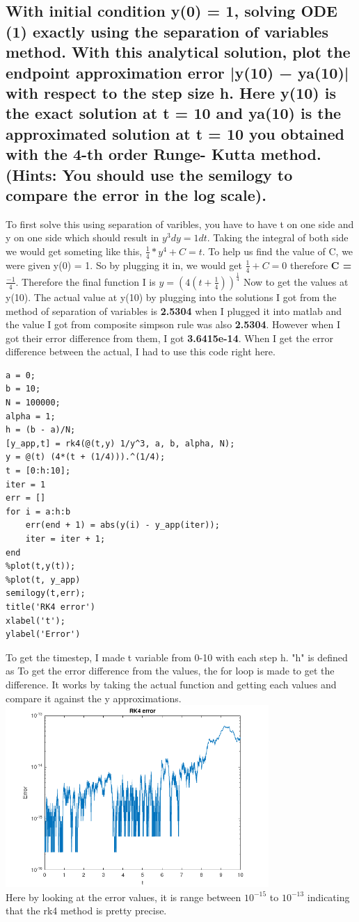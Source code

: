 \documentclass[12pt,letterpaper]{article}
\begin{document}
\subsection{With initial condition y(0) = 1, solving ODE (1) exactly using the separation of variables
method. With this analytical solution, plot the endpoint approximation error |y(10) −
ya(10)| with respect to the step size h. Here y(10) is the exact solution at t = 10 and
ya(10) is the approximated solution at t = 10 you obtained with the 4-th order Runge-
Kutta method. (Hints: You should use the semilogy to compare the error in the log
scale).}
To first solve this using separation of varibles, you have to have t on one side and y on one side which should result in \boldmath$y^{3} dy = 1 dt$.
Taking the integral of both side we would get someting like this, \boldmath$\frac{1}{4}*y^{4} + C = t$.
To help us find the value of C, we were given y(0) = 1. So by plugging it in, we would get \boldmath$\frac{1}{4} + C = 0$ therefore \textbf{C = \boldmath$\frac{-1}{4}$}. 
Therefore the final function I is $y = (4(t + \frac{1}{4}))^{\frac{1}{4}}$
Now to get the values at y(10). The actual value at y(10) by plugging into the solutions I got from the method of separation of variables is \textbf{2.5304} when I plugged it into matlab
and the value I got from composite simpson rule was also \textbf{2.5304}. However when I got their error difference from them, I got \textbf{3.6415e-14}. 
When I get the error difference between the actual, I had to use this code right here.
\begin{lstlisting}
a = 0;
b = 10;
N = 100000;
alpha = 1;
h = (b - a)/N;
[y_app,t] = rk4(@(t,y) 1/y^3, a, b, alpha, N);
y = @(t) (4*(t + (1/4))).^(1/4);
t = [0:h:10];
iter = 1
err = []
for i = a:h:b
    err(end + 1) = abs(y(i) - y_app(iter));
    iter = iter + 1;
end
%plot(t,y(t));
%plot(t, y_app)
semilogy(t,err);
title('RK4 error')
xlabel('t');
ylabel('Error')
\end{lstlisting}
To get the timestep, I made t variable from 0-10 with each step h. "h" is defined as 
To get the error difference from the values, the for loop is made to get the difference. It works by taking the actual function and getting each values and compare it against the y approximations.
\\\includegraphics[width=100mm]{rk4_err}\\
Here by looking at the error values, it is range between $10^{-15}$ to $10^{-13}$ indicating that the rk4 method is pretty precise.








	
\end{document}
